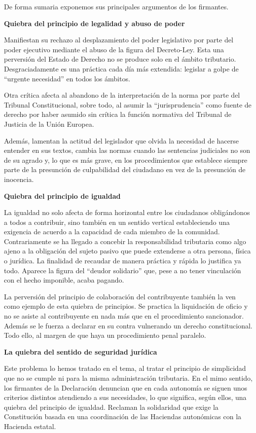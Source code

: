 \documentclass[
]{article}
\begin{document}
De forma sumaria exponemos sus principales argumentos de los firmantes.

\textbf{Quiebra del principio de legalidad y abuso de poder}

Manifiestan su rechazo al desplazamiento del poder legislativo por parte
del poder ejecutivo mediante el abuso de la figura del Decreto-Ley. Esta
una perversión del Estado de Derecho no se produce solo en el ámbito
tributario. Desgraciadamente es una práctica cada día más extendida:
legislar a golpe de ``urgente necesidad'' en todos los ámbitos.

Otra crítica afecta al abandono de la interpretación de la norma por
parte del Tribunal Constitucional, sobre todo, al asumir la
``jurisprudencia'' como fuente de derecho por haber asumido sin crítica
la función normativa del Tribunal de Justicia de la Unión Europea.

Además, lamentan la actitud del legislador que olvida la necesidad de
hacerse entender en sus textos, cambia las normas cuando las sentencias
judiciales no son de su agrado y, lo que es más grave, en los
procedimientos que establece siempre parte de la presunción de
culpabilidad del ciudadano en vez de la presunción de inocencia.

\textbf{Quiebra del principio de igualdad}

La igualdad no solo afecta de forma horizontal entre los ciudadanos
obligándonos a todos a contribuir, sino también en un sentido vertical
estableciendo una exigencia de acuerdo a la capacidad de cada miembro de
la comunidad. Contrariamente se ha llegado a concebir la responsabilidad
tributaria como algo ajeno a la obligación del sujeto pasivo que puede
extenderse a otra persona, física o jurídica. La finalidad de recaudar
de manera práctica y rápida lo justifica ya todo. Aparece la figura del
``deudor solidario'' que, pese a no tener vinculación con el hecho
imponible, acaba pagando.

La perversión del principio de colaboración del contribuyente también la
ven como ejemplo de esta quiebra de principios. Se practica la
liquidación de oficio y no se asiste al contribuyente en nada más que en
el procedimiento sancionador. Además se le fuerza a declarar en su
contra vulnerando un derecho constitucional. Todo ello, al margen de que
haya un procedimiento penal paralelo.

\textbf{La quiebra del sentido de seguridad jurídica}

Este problema lo hemos tratado en el tema, al tratar el principio de
simplicidad que no se cumple ni para la misma administración tributaria.
En el mimo sentido, los firmantes de la Declaración denuncian que en
cada autonomía se siguen unos criterios distintos atendiendo a sus
necesidades, lo que significa, según ellos, una quiebra del principio de
igualdad. Reclaman la solidaridad que exige la Constitución basada en
una coordinación de las Haciendas autonómicas con la Hacienda estatal.
\end{document}
